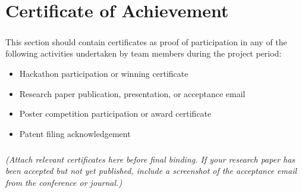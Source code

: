 \chapter*{Certificate of Achievement}
\paragraph{}This section should contain certificates as proof of participation in any of the following activities undertaken by team members during the project period:

\begin{itemize}
    \item Hackathon participation or winning certificate
    \item Research paper publication, presentation, or acceptance email
    \item Poster competition participation or award certificate
    \item Patent filing acknowledgement
\end{itemize}

\paragraph{}\textit{(Attach relevant certificates here before final binding. If your research paper has been accepted but not yet published, include a screenshot of the acceptance email from the conference or journal.)}
